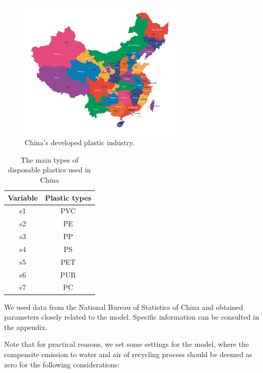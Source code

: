 \documentclass{mcmthesis}
\begin{document}
\begin{figure}[!htb] %
	\centering %
	\includegraphics[width=0.7\textwidth]{figures/Map.png} %
	\caption{China's developed plastic industry.} %
	\label{fig09} %
	
\end{figure}

\begin{table}[]
	\center
	\caption{The main types of disposable plastics used in China}
	\label{type}
	\begin{tabular}{|c|c|}
		\hline
		\textbf{Variable} & \textbf{Plastic types} \\ \hline
		s1                & PVC                    \\ \hline
		s2                & PE                     \\ \hline
		s3                & PP                     \\ \hline
		s4                & PS                     \\ \hline
		s5                & PET                    \\ \hline
		s6                & PUR                    \\ \hline
		s7                & PC                     \\ \hline
	\end{tabular}
\end{table}

We used data from the National Bureau of Statistics of China\cite{Country} and obtained parameters closely related to the model. Specific information can be consulted in the appendix.

Note that for practical reasons, we set some settings for the model, where the compensite emission to water and air of recycling process should be deemed as zero for the following considerations:
\end{document}
